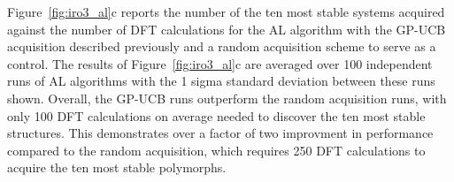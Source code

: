 %


%
Figure~\ref{fig:iro3_al}c reports the number of the ten most stable systems acquired against the number of DFT calculations for the AL algorithm with the GP-UCB acquisition described previously and a random acquisition scheme to serve as a control.
%
The results of Figure~\ref{fig:iro3_al}c are averaged over 100 independent runs of AL algorithms with the 1 sigma standard deviation between these runs shown.
%
Overall, the GP-UCB runs outperform the random acquisition runs, with only \num{100} DFT calculations on average needed to discover the ten most stable structures.
%
This demonstrates over a factor of two improvment in performance compared to the random acquisition, which requires \mytilde\num{250} DFT calculations to acquire the ten most stable polymorphs.


